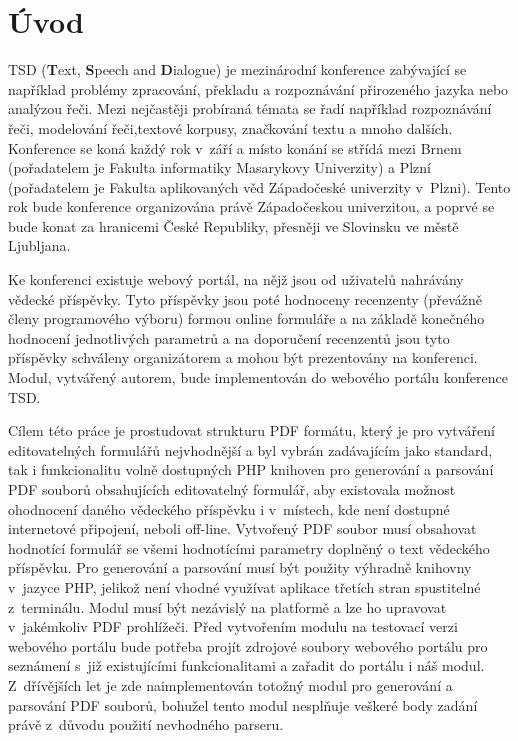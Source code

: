 \chapter{Úvod}
TSD (\textbf{T}ext, \textbf{S}peech and \textbf{D}ialogue) je mezinárodní konference zabývající se například problémy zpracování, překladu a rozpoznávání přirozeného jazyka nebo analýzou řeči. Mezi nejčastěji probíraná témata se řadí například rozpoznávání řeči, modelování řeči,textové korpusy, značkování textu a mnoho dalších. Konference se koná každý rok v~září a místo konání se střídá mezi Brnem (pořadatelem je Fakulta informatiky Masarykovy Univerzity) a Plzní (pořadatelem je Fakulta aplikovaných věd Západočeské univerzity v~Plzni). Tento rok bude konference organizována právě Západočeskou univerzitou, a poprvé se bude konat za hranicemi České Republiky, přesněji ve Slovinsku ve městě Ljubljana.
\par
Ke konferenci existuje webový portál, na nějž jsou od uživatelů nahrávány vědecké příspěvky. Tyto příspěvky jsou poté hodnoceny recenzenty (převážně členy programového výboru) formou online formuláře a na základě konečného hodnocení jednotlivých parametrů a na doporučení recenzentů jsou tyto příspěvky schváleny organizátorem a mohou být prezentovány na konferenci. Modul, vytvářený autorem, bude implementován do webového portálu konference TSD.
\par
Cílem této práce je prostudovat strukturu PDF formátu, který je pro vytváření editovatelných formulářů nejvhodnější a byl vybrán zadávajícím jako standard, tak i funkcionalitu volně dostupných PHP knihoven pro generování a parsování PDF souborů obsahujících editovatelný formulář, aby existovala možnost ohodnocení daného vědeckého příspěvku i v~místech, kde není dostupné internetové připojení, neboli off-line. Vytvořený PDF soubor musí obsahovat hodnotící formulář se všemi hodnotícími parametry doplněný o text vědeckého příspěvku. Pro generování a parsování musí být použity výhradně knihovny v~jazyce PHP, jelikož není vhodné využívat aplikace třetích stran spustitelné z~terminálu. Modul musí být nezávislý na platformě a lze ho upravovat v~jakémkoliv PDF prohlížeči. Před vytvořením modulu na testovací verzi webového portálu bude potřeba projít zdrojové soubory webového portálu pro seznámení s~již existujícími funkcionalitami a zařadit do portálu i náš modul. Z~dřívějších let je zde naimplementován totožný modul pro generování a parsování PDF souborů, bohužel tento modul nesplňuje veškeré body zadání právě z~důvodu použití nevhodného parseru.
 